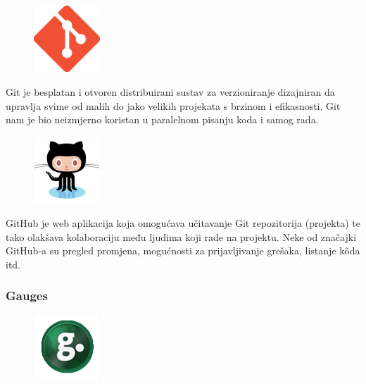 \documentclass[11pt]{scrreprt}
\begin{document}
\begin{figure}
  \vspace{-10pt}
  \includegraphics[width=2.5cm]{logos/git}
  \vspace{-30pt}
\end{figure}

Git je besplatan i otvoren distribuirani sustav za verzioniranje dizajniran da
upravlja svime od malih do jako velikih projekata s brzinom i
efikasnosti.\cite{git} Git nam je bio neizmjerno koristan u paralelnom pisanju
koda i samog rada.

\begin{figure}
  \vspace{-10pt}
  \includegraphics[width=2.5cm]{logos/github}
  \vspace{-30pt}
\end{figure}

GitHub je web aplikacija koja omogućava učitavanje Git repozitorija (projekta)
te tako olakšava kolaboraciju među ljudima koji rade na projektu.\cite{github}
Neke od značajki GitHub-a su pregled promjena, mogućnosti za prijavljivanje
grešaka, listanje kôda itd.

\subsubsection{Gauges}

\begin{figure}
  \vspace{-10pt}
  \includegraphics[width=2.5cm]{logos/gauges}
  \vspace{-30pt}
\end{figure}
\end{document}
